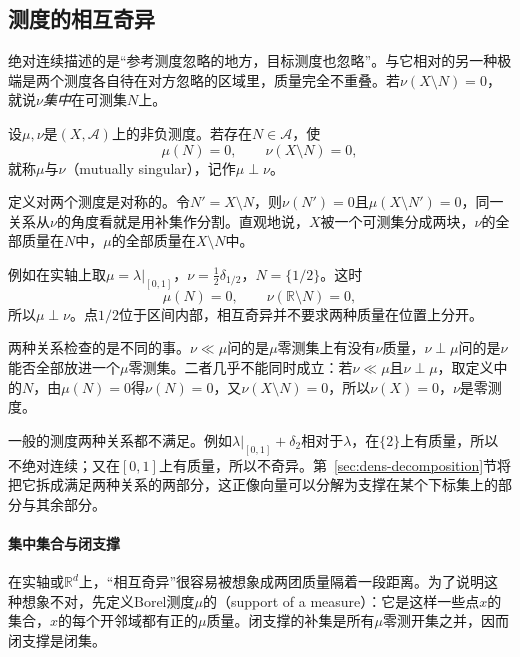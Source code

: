 \subsection{测度的相互奇异}
\label{sec:dens-mutual-singularity}

绝对连续描述的是“参考测度忽略的地方，目标测度也忽略”。与它相对的另一种极端是两个测度各自待在对方忽略的区域里，质量完全不重叠。若$\nu(X\setminus N)=0$，就说$\nu$\emph{集中}在可测集$N$上。

\begin{definition}[相互奇异]
\label{def:dens-mutual-singularity}
设$\mu,\nu$是$(X,\mathcal A)$上的非负测度。若存在$N\in\mathcal A$，使
\begin{equation}
\mu(N)=0,\qquad\nu(X\setminus N)=0 ,
\label{eq:dens-singular-def}
\end{equation}
就称$\mu$与$\nu$（mutually singular），记作$\mu\perp\nu$。
\end{definition}

定义对两个测度是对称的。令$N'=X\setminus N$，则$\nu(N')=0$且$\mu(X\setminus N')=0$，同一关系从$\nu$的角度看就是用补集作分割。直观地说，$X$被一个可测集分成两块，$\nu$的全部质量在$N$中，$\mu$的全部质量在$X\setminus N$中。

例如在实轴上取$\mu=\lambda|_{[0,1]}$，$\nu=\tfrac12\delta_{1/2}$，$N=\{1/2\}$。这时
\[
\mu(N)=0,\qquad\nu(\mathbb R\setminus N)=0,
\]
所以$\mu\perp\nu$。点$1/2$位于区间内部，相互奇异并不要求两种质量在位置上分开。

两种关系检查的是不同的事。$\nu\ll\mu$问的是$\mu$零测集上有没有$\nu$质量，$\nu\perp\mu$问的是$\nu$能否全部放进一个$\mu$零测集。二者几乎不能同时成立：若$\nu\ll\mu$且$\nu\perp\mu$，取定义中的$N$，由$\mu(N)=0$得$\nu(N)=0$，又$\nu(X\setminus N)=0$，所以$\nu(X)=0$，$\nu$是零测度。

一般的测度两种关系都不满足。例如$\lambda|_{[0,1]}+\delta_2$相对于$\lambda$，在$\{2\}$上有质量，所以不绝对连续；又在$[0,1]$上有质量，所以不奇异。第~\ref{sec:dens-decomposition}节将把它拆成满足两种关系的两部分，这正像向量可以分解为支撑在某个下标集上的部分与其余部分。

\paragraph{集中集合与闭支撑}
在实轴或$\mathbb R^d$上，“相互奇异”很容易被想象成两团质量隔着一段距离。为了说明这种想象不对，先定义Borel测度$\mu$的（support of a measure）：它是这样一些点$x$的集合，$x$的每个开邻域都有正的$\mu$质量。闭支撑的补集是所有$\mu$零测开集之并，因而闭支撑是闭集。

